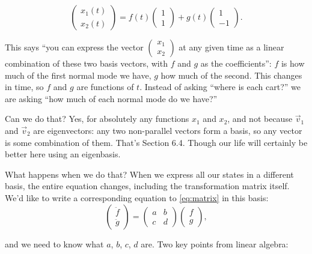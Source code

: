\documentclass[12pt]{article}
\numberwithin{equation}{section}
\begin{document}
\begin{equation}
  \label{eq:fg}
  \begin{pmatrix} x_1(t) \\ x_2(t) \end{pmatrix}
  = f(t)\begin{pmatrix} 1 \\ 1 \end{pmatrix} + g(t)\begin{pmatrix} 1 \\ -1 \end{pmatrix}.
\end{equation}

This says ``you can express the vector $\left(\begin{smallmatrix} x_1 \\
x_2 \end{smallmatrix}\right)$ at any given time as a
linear combination of these two basis vectors, with $f$ and $g$ as the
coefficients'': $f$ is how much of the first normal mode we have, $g$ how
much of the second. This changes in time, so $f$ and $g$ are functions of
$t$. Instead of asking ``where is each cart?'' we are asking ``how much of
each normal mode do we have?''

Can we do that? Yes, for absolutely any functions $x_1$ and $x_2$, and
not because $\vec{v}_1$ and $\vec{v}_2$ are eigenvectors: any two
non-parallel vectors form a basis, so any vector is some combination of
them. That's Section 6.4. Though our life will certainly be better here using an eigenbasis.

What happens when we do that? When we express all our states in a
different basis, the entire equation changes, including the
transformation matrix itself. We'd like to write a corresponding equation
to \eqref{eq:matrix} in this basis:
\begin{equation}
  \label{eq:abcd}
  \begin{pmatrix} \ddot{f} \\ \ddot{g} \end{pmatrix}
  = \begin{pmatrix} a & b \\ c & d \end{pmatrix}
  \begin{pmatrix} f \\ g \end{pmatrix},
\end{equation}

\noindent and we need to know what $a$, $b$, $c$, $d$ are. Two key points
from linear algebra:
\end{document}
